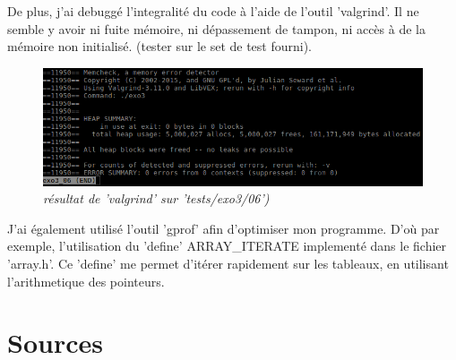 \documentclass[a4paper,10pt]{article}
\begin{document}
	De plus, j'ai debuggé l'integralité du code à l'aide de l'outil 'valgrind'.
	Il ne semble y avoir ni fuite mémoire, ni dépassement de tampon, ni accès à de la mémoire non initialisé.
	(tester sur le set de test fourni).\newline\newline
	\begin{figure}[!h]
	  \begin{center}
	    \includegraphics[width=12cm,height=\textheight,keepaspectratio]{./images/valgrind.png}
	  \end{center}
	  \caption{\textit{résultat de 'valgrind' sur 'tests/exo3/06')}}
	\end{figure}
	
	
	J'ai également utilisé l'outil 'gprof' afin d'optimiser mon programme.
	D'où par exemple, l'utilisation du 'define' ARRAY\_ITERATE implementé dans le fichier 'array.h'.
	Ce 'define' me permet d'itérer rapidement sur les tableaux, en utilisant l'arithmetique des pointeurs.

  \newpage
  \section{Sources}

    
\end{document}
